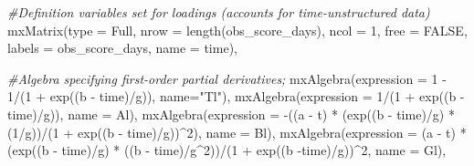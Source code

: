 \documentclass[
12pt, %
twoside,
english]{guelphthesis}
\newenvironment{Shaded}{\begin{snugshade}}{\end{snugshade}}
\newcommand{\AttributeTok}[1]{\textcolor[rgb]{0.77,0.63,0.00}{#1}}
\newcommand{\CommentTok}[1]{\textcolor[rgb]{0.56,0.35,0.01}{\textit{#1}}}
\newcommand{\ConstantTok}[1]{\textcolor[rgb]{0.00,0.00,0.00}{#1}}
\newcommand{\DecValTok}[1]{\textcolor[rgb]{0.00,0.00,0.81}{#1}}
\newcommand{\FunctionTok}[1]{\textcolor[rgb]{0.00,0.00,0.00}{#1}}
\newcommand{\NormalTok}[1]{#1}
\newcommand{\SpecialCharTok}[1]{\textcolor[rgb]{0.00,0.00,0.00}{#1}}
\newcommand{\StringTok}[1]{\textcolor[rgb]{0.31,0.60,0.02}{#1}}
\begin{document}
\begin{Shaded}
\begin{Highlighting}[numbers=left,,]
  \CommentTok{\#Definition variables set for loadings (accounts for time{-}unstructured data) }
  \FunctionTok{mxMatrix}\NormalTok{(}\AttributeTok{type =} \StringTok{\textquotesingle{}Full\textquotesingle{}}\NormalTok{, }\AttributeTok{nrow =} \FunctionTok{length}\NormalTok{(obs\_score\_days), }\AttributeTok{ncol =} \DecValTok{1}\NormalTok{, }\AttributeTok{free =} \ConstantTok{FALSE}\NormalTok{, }
  \AttributeTok{labels =}\NormalTok{ obs\_score\_days, }\AttributeTok{name =} \StringTok{\textquotesingle{}time\textquotesingle{}}\NormalTok{),}

  \CommentTok{\#Algebra specifying first{-}order partial derivatives; }
  \FunctionTok{mxAlgebra}\NormalTok{(}\AttributeTok{expression =} \DecValTok{1} \SpecialCharTok{{-}} \DecValTok{1}\SpecialCharTok{/}\NormalTok{(}\DecValTok{1} \SpecialCharTok{+} \FunctionTok{exp}\NormalTok{((b }\SpecialCharTok{{-}}\NormalTok{ time)}\SpecialCharTok{/}\NormalTok{g)), }\AttributeTok{name=}\StringTok{"Tl"}\NormalTok{),}
  \FunctionTok{mxAlgebra}\NormalTok{(}\AttributeTok{expression =} \DecValTok{1}\SpecialCharTok{/}\NormalTok{(}\DecValTok{1} \SpecialCharTok{+} \FunctionTok{exp}\NormalTok{((b }\SpecialCharTok{{-}}\NormalTok{ time)}\SpecialCharTok{/}\NormalTok{g)), }\AttributeTok{name =} \StringTok{\textquotesingle{}Al\textquotesingle{}}\NormalTok{), }
  \FunctionTok{mxAlgebra}\NormalTok{(}\AttributeTok{expression =} \SpecialCharTok{{-}}\NormalTok{((a }\SpecialCharTok{{-}}\NormalTok{ t) }\SpecialCharTok{*}\NormalTok{ (}\FunctionTok{exp}\NormalTok{((b }\SpecialCharTok{{-}}\NormalTok{ time)}\SpecialCharTok{/}\NormalTok{g) }\SpecialCharTok{*}\NormalTok{ (}\DecValTok{1}\SpecialCharTok{/}\NormalTok{g))}\SpecialCharTok{/}\NormalTok{(}\DecValTok{1} \SpecialCharTok{+} \FunctionTok{exp}\NormalTok{((b }\SpecialCharTok{{-}}\NormalTok{ time)}\SpecialCharTok{/}\NormalTok{g))}\SpecialCharTok{\^{}}\DecValTok{2}\NormalTok{), }\AttributeTok{name =} \StringTok{\textquotesingle{}Bl\textquotesingle{}}\NormalTok{),}
  \FunctionTok{mxAlgebra}\NormalTok{(}\AttributeTok{expression =}\NormalTok{  (a }\SpecialCharTok{{-}}\NormalTok{ t) }\SpecialCharTok{*}\NormalTok{ (}\FunctionTok{exp}\NormalTok{((b }\SpecialCharTok{{-}}\NormalTok{ time)}\SpecialCharTok{/}\NormalTok{g) }\SpecialCharTok{*}\NormalTok{ ((b }\SpecialCharTok{{-}}\NormalTok{ time)}\SpecialCharTok{/}\NormalTok{g}\SpecialCharTok{\^{}}\DecValTok{2}\NormalTok{))}\SpecialCharTok{/}\NormalTok{(}\DecValTok{1} \SpecialCharTok{+} \FunctionTok{exp}\NormalTok{((b }\SpecialCharTok{{-}}\NormalTok{time)}\SpecialCharTok{/}\NormalTok{g))}\SpecialCharTok{\^{}}\DecValTok{2}\NormalTok{, }\AttributeTok{name =} \StringTok{\textquotesingle{}Gl\textquotesingle{}}\NormalTok{),}
  

\end{Highlighting}
\end{Shaded}
\end{document}
